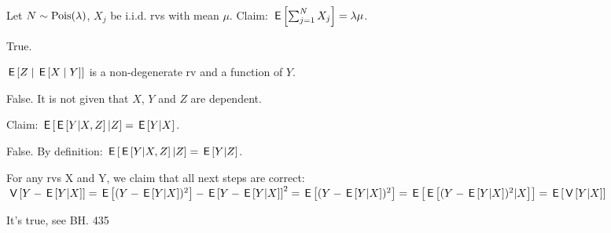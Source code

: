 \documentclass[tf-tutorial-all.tex]{subfiles}
\begin{document}
\begin{truefalse}
Let $N \sim \Pois{\lambda}$, $X_j$ be i.i.d. rvs with mean $\mu$. Claim: $\E{\sum_{j=1}^NX_j}=\lambda\mu$.
\begin{solution}
True.
\end{solution}
\end{truefalse}

\begin{truefalse}
$\E{Z \mid \E{X \mid Y}}$ is a non-degenerate rv and a function of $Y$.
\begin{solution}
False. It is not given that $X$, $Y$ and $Z$ are dependent.
\end{solution}
\end{truefalse}

\begin{truefalse}
Claim: $\E{\E{Y|X,Z}|Z} = \E{Y|X}$.
\begin{solution}
False. By definition: $\E{\E{Y|X,Z}|Z} = \E{Y|Z} $.
\end{solution}
\end{truefalse}

\begin{truefalse}
For any rvs X and Y, we claim that all next steps are correct:
$\V{Y-\E{Y|X}} = \E{(Y-\E{Y|X})^2} - \E{Y-\E{Y|X}}^2 = \E{(Y-\E{Y|X})^2} = \E{\E{(Y-\E{Y|X})^2|X}} = \E{\V{Y|X}}$
\begin{solution}
It's true, see BH. 435
\end{solution}
\end{truefalse}
\end{document}

